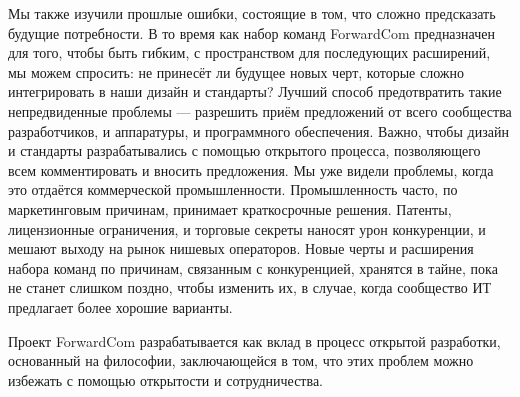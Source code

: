 \documentclass[forwardcom.tex]{subfiles}
\begin{document}
Мы также изучили прошлые ошибки, состоящие в том, что сложно предсказать будущие потребности. В то время как набор команд ForwardCom предназначен для того, чтобы быть гибким, с пространством для последующих расширений, мы можем спросить: не принесёт ли будущее новых черт, которые сложно интегрировать в наши дизайн и стандарты? Лучший способ предотвратить такие непредвиденные проблемы --- разрешить приём предложений от всего сообщества разработчиков, и аппаратуры, и программного обеспечения. Важно, чтобы дизайн и стандарты разрабатывались с помощью открытого процесса, позволяющего всем комментировать и вносить предложения. Мы уже видели проблемы, когда это отдаётся коммерческой промышленности. Промышленность часто, по маркетинговым причинам, принимает краткосрочные решения. Патенты, лицензионные ограничения, и торговые секреты наносят урон конкуренции, и мешают выходу на рынок нишевых операторов. Новые черты и расширения набора команд по причинам, связанным с конкуренцией, хранятся в тайне, пока не станет слишком поздно, чтобы изменить их, в случае, когда сообщество ИТ предлагает более хорошие варианты.

Проект ForwardCom разрабатывается как вклад в процесс открытой разработки, основанный на философии, заключающейся в том, что этих проблем можно избежать с помощью открытости и сотрудничества.
\end{document}
